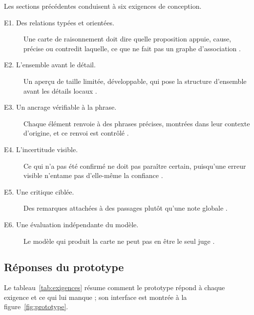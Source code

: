 Les sections précédentes conduisent à six exigences de conception.
\begin{description}
  \item[E1. Des relations typées et orientées.] Une carte de raisonnement doit dire quelle proposition appuie, cause, précise ou contredit laquelle, ce que ne fait pas un graphe d’association \parencite{ref26,ref13}.
  \item[E2. L’ensemble avant le détail.] Un aperçu de taille limitée, développable, qui pose la structure d’ensemble avant les détails locaux \parencite{ref27,ref03,ref08}.
  \item[E3. Un ancrage vérifiable à la phrase.] Chaque élément renvoie à des phrases précises, montrées dans leur contexte d’origine, et ce renvoi est contrôlé \parencite{ref17,ref28,ref15}.
  \item[E4. L’incertitude visible.] Ce qui n’a pas été confirmé ne doit pas paraître certain, puisqu’une erreur visible n’entame pas d’elle-même la confiance \parencite{ref01,ref04}.
  \item[E5. Une critique ciblée.] Des remarques attachées à des passages plutôt qu’une note globale \parencite{ref18,ref19,ref30}.
  \item[E6. Une évaluation indépendante du modèle.] Le modèle qui produit la carte ne peut pas en être le seul juge \parencite{ref06,ref29}.
\end{description}

\subsection{Réponses du prototype}

Le tableau~\ref{tab:exigences} résume comment le prototype répond à chaque exigence et ce qui lui manque ; son interface est montrée à la figure~\ref{fig:prototype}.

